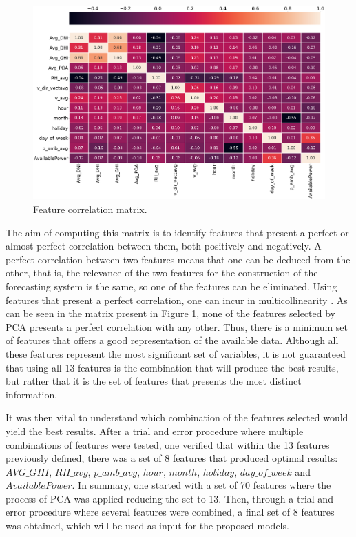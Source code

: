 \begin{figure}[h!]
    \centering
    \begin{center}
    \includegraphics[width=1\textwidth]{Images/corr1.PNG}
    \caption{Feature correlation matrix.}
    \label{corr}
    \end{center}
\end{figure}


The aim of computing this matrix is to identify features that present a perfect or almost perfect correlation between them, both positively and negatively. A perfect correlation between two features means that one can be deduced from the other, that is, the relevance of the two features for the construction of the forecasting system is the same, so one of the features can be eliminated. Using features that present a perfect correlation, one can incur in multicollinearity \cite{multicollinearity}. As can be seen in the matrix present in Figure \ref{corr}, none of the features selected by \ac{PCA} presents a perfect correlation with any other. Thus, there is a minimum set of features that offers a good representation of the available data. Although all these features represent the most significant set of variables, it is not guaranteed that using all 13 features is the combination that will produce the best results, but rather that it is the set of features that presents the most distinct information. 

It was then vital to understand which combination of the features selected would yield the best results. After a trial and error procedure where multiple combinations of features were tested, one verified that within the 13 features previously defined, there was a set of 8 features that produced optimal results: $AVG\_GHI$, $RH\_avg$, $p\_amb\_avg$, $hour$, $month$, $holiday$, $day\_of\_week$ and $AvailablePower$. 
In summary, one started with a set of 70 features where the process of \ac{PCA} was applied reducing the set to 13. Then, through a trial and error procedure where several features were combined, a final set of 8 features was obtained, which will be used as input for the proposed models.



